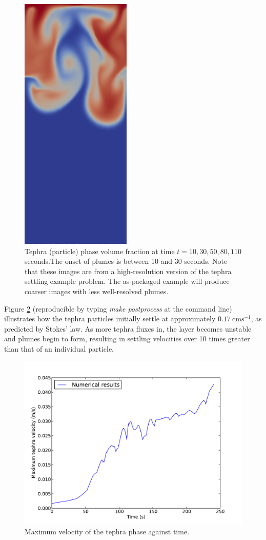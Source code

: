 \begin{figure}[H]
	      \includegraphics[width=0.19\columnwidth]{./examples_images/tephra_settling/tephra_influx_5.png}
   \caption{Tephra (particle) phase volume fraction at time $t = 10, 30, 50, 80, 110$ seconds.The onset of plumes is between 10 and 30 seconds. Note that these images are from a high-resolution version of the tephra settling example problem. The as-packaged example will produce coarser images with less well-resolved plumes.}
   \label{fig:tephra_settling}
\end{figure}

Figure \ref{fig:tephra_settling_velocity} (reproducible by typing \textit{make postprocess} at the command line) illustrates how the tephra particles initially settle at approximately $0.17\ \mathrm{cms^{-1}}$, as predicted by Stokes' law. As more tephra fluxes in, the layer becomes unstable and plumes begin to form, resulting in settling velocities over 10 times greater than that of an individual particle.

\begin{figure}[H]
	\centering
	      \includegraphics[width=0.8\columnwidth]{./examples_images/tephra_settling/tephra_velocity.pdf}
   \caption{Maximum velocity of the tephra phase against time.}
   \label{fig:tephra_settling_velocity}
\end{figure}

